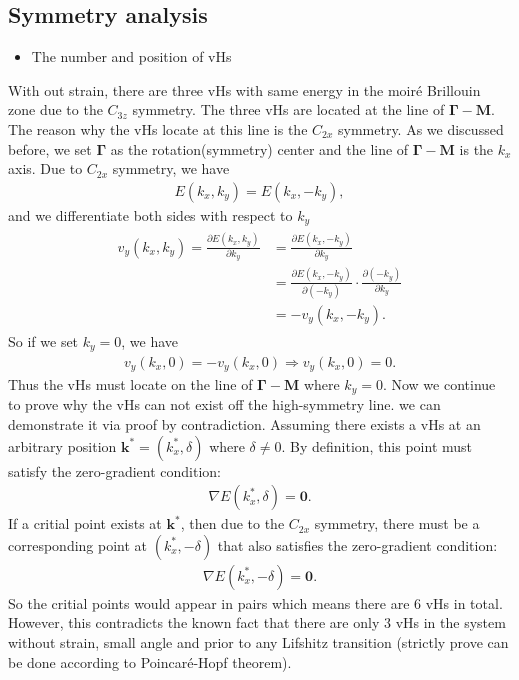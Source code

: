 \documentclass[10pt, oneside]{article}
\newcommand{\p}[1]{\left(#1\right)}
\begin{document}
\subsection{Symmetry analysis}

\begin{itemize}
	\item The number and position of vHs
\end{itemize}
With out strain, there are three vHs with same energy in the moiré Brillouin zone due to the \(C_{3z}\) symmetry. The three vHs are located at the line of \(\bm{\Gamma} - \bm{M}\). The reason why the vHs locate at this line is the \(C_{2x}\) symmetry. As we discussed before, we set \(\bm{\Gamma}\) as the rotation(symmetry) center and the line of \(\bm{\Gamma} - \bm{M}\) is the \(k_x\) axis. Due to \(C_{2x}\) symmetry, we have 
\begin{align}
	E\p{k_x, k_y} = E\p{k_x, - k_y},
\end{align}
and we differentiate both sides with respect to \(k_y\)
\begin{align}
	\begin{split}
		v_{y} \p{k_x, k_y} = \frac{\partial E\p{k_x, k_y}}{\partial k_y} & = \frac{\partial E\p{k_x, - k_y}}{\partial k_y} \\
		& = \frac{\partial E \p{k_x, - k_y}}{\partial \p{- k_y}} \cdot \frac{\partial \p{- k_y}}{\partial k_y} \\
		& = - v_{y} \p{k_x, - k_y}.
	\end{split}
\end{align}
So if we set \(k_y = 0\), we have
\begin{align}
	v_{y} \p{k_x, 0} = - v_{y} \p{k_x, 0} \Rightarrow v_{y} \p{k_x, 0} = 0.
\end{align}
Thus the vHs must locate on the line of \(\bm{\Gamma} - \bm{M}\) where \(k_y = 0\). Now we continue to prove why the vHs can not exist off the high-symmetry line. we can demonstrate it via proof by contradiction. Assuming there exists a vHs at an arbitrary position \(\bm{k}^{*} = \p{k^{*}_{x} , \delta}\) where \(\delta \neq 0\). By definition, this point must satisfy the zero-gradient condition:
\begin{align}
	\nabla E \p{k^{*}_{x} , \delta} = \bm{0}.
\end{align}
If a critial point exists at \(\bm{k}^{*}\), then due to the \(C_{2x}\) symmetry, there must be a corresponding point at \(\p{k^{*}_{x}, -\delta}\) that also satisfies the zero-gradient condition:
\begin{align}
	\nabla E \p{k^{*}_{x} , -\delta} = \bm{0}.
\end{align}
So the critial points would appear in pairs which means there are \(6\) vHs in total. However, this contradicts the known fact that there are only \(3\) vHs in the system without strain, small angle and prior to any Lifshitz transition (strictly prove can be done according to Poincaré-Hopf theorem).
\end{document}
